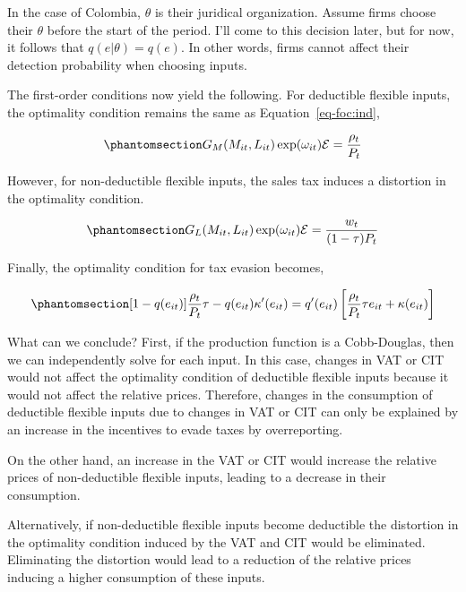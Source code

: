 \documentclass[
  12pt]{article}
\theoremstyle{definition}
\theoremstyle{remark}
\begin{document}
In the case of Colombia, \(\theta\) is their juridical organization.
Assume firms choose their \(\theta\) before the start of the period.
I'll come to this decision later, but for now, it follows that
\(q(e|\theta)=q(e)\). In other words, firms cannot affect their
detection probability when choosing inputs.

The first-order conditions now yield the following. For deductible
flexible inputs, the optimality condition remains the same as
Equation~\ref{eq-foc:ind},

\begin{equation}\phantomsection\label{eq-foc:deduct}{
G_M(M_{it}, L_{it})\exp(\omega_{it})\mathcal{E}=\frac{\rho_{t}}{P_t}
}\end{equation}

However, for non-deductible flexible inputs, the sales tax induces a
distortion in the optimality condition.

\begin{equation}\phantomsection\label{eq-foc:non-deduct}{
G_L(M_{it}, L_{it})\exp(\omega_{it})\mathcal{E}=\frac{w_{t}}{(1-\tau)P_t}
}\end{equation}

Finally, the optimality condition for tax evasion becomes,

\begin{equation}\phantomsection\label{eq-foc-cont-e}{
[1-q(e_{it})]\frac{\rho_t}{P_t}\tau-q(e_{it})\kappa'(e_{it})=q'(e_{it})\left[\frac{\rho_t}{P_t}\tau e_{it} + \kappa(e_{it})\right]
}\end{equation}

What can we conclude? First, if the production function is a
Cobb-Douglas, then we can independently solve for each input. In this
case, changes in VAT or CIT would not affect the optimality condition of
deductible flexible inputs because it would not affect the relative
prices. Therefore, changes in the consumption of deductible flexible
inputs due to changes in VAT or CIT can only be explained by an increase
in the incentives to evade taxes by overreporting.

On the other hand, an increase in the VAT or CIT would increase the
relative prices of non-deductible flexible inputs, leading to a decrease
in their consumption.

Alternatively, if non-deductible flexible inputs become deductible the
distortion in the optimality condition induced by the VAT and CIT would
be eliminated. Eliminating the distortion would lead to a reduction of
the relative prices inducing a higher consumption of these inputs.
\end{document}
